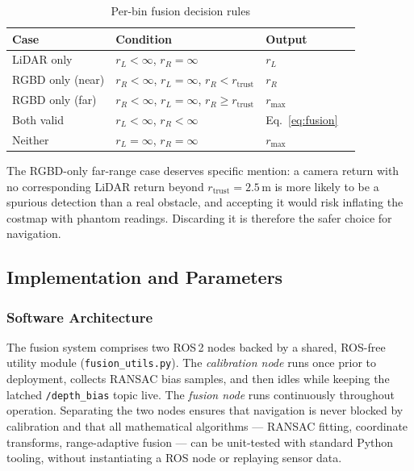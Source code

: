 \begin{table}[H]
\centering
\caption{Per-bin fusion decision rules}
\label{tab:fusion_cases}
\begin{tabular}{llll}
\hline
\textbf{Case} & \textbf{Condition} & \textbf{Output} \\
\hline
LiDAR only
    & $r_{L}{<}\infty$,\; $r_{R}{=}\infty$
    & $r_{L}$ \\
RGBD only (near)
    & $r_{R}{<}\infty$,\; $r_{L}{=}\infty$,\; $r_{R} < r_{\text{trust}}$
    & $r_{R}$ \\
RGBD only (far)
    & $r_{R}{<}\infty$,\; $r_{L}{=}\infty$,\; $r_{R} \geq r_{\text{trust}}$
    & $r_{\max}$ \\
Both valid
    & $r_{L}{<}\infty$,\; $r_{R}{<}\infty$
    & Eq.~\eqref{eq:fusion} \\
Neither
    & $r_{L}{=}\infty$,\; $r_{R}{=}\infty$
    & $r_{\max}$ \\
\hline
\end{tabular}
\end{table}

The RGBD-only far-range case deserves specific mention: a camera return
with no corresponding LiDAR return beyond $r_{\text{trust}} = 2.5$\,m
is more likely to be a spurious detection than a real obstacle, and
accepting it would risk inflating the costmap with phantom readings.
Discarding it is therefore the safer choice for navigation.

\subsection{Implementation and Parameters}

\subsubsection{Software Architecture}

The fusion system comprises two ROS\,2 nodes backed by a shared,
ROS-free utility module (\texttt{fusion\_utils.py}). The
\textit{calibration node} runs once prior to deployment, collects
RANSAC bias samples, and then idles while keeping the latched
\texttt{/depth\_bias} topic live. The \textit{fusion node} runs
continuously throughout operation. Separating the two nodes ensures
that navigation is never blocked by calibration and that all
mathematical algorithms — RANSAC fitting, coordinate transforms,
range-adaptive fusion — can be unit-tested with standard Python
tooling, without instantiating a ROS node or replaying sensor data.


